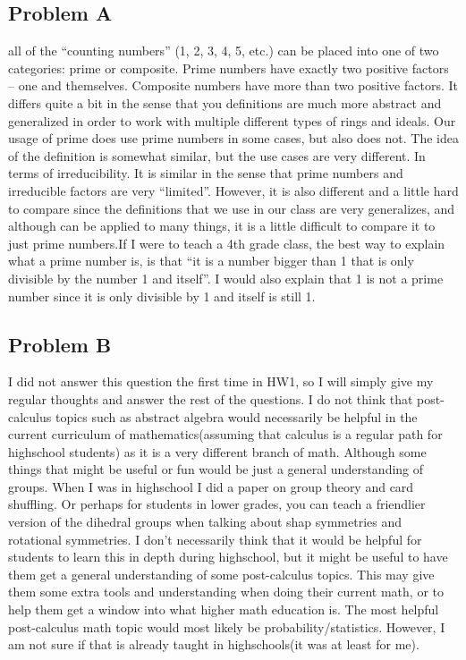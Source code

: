 \documentclass[12pt]{article}
\begin{document}
\subsection*{Problem A}
all of the “counting numbers” (1, 2, 3, 4, 5, etc.) can be placed into one of two categories: prime or composite. Prime numbers have exactly two positive factors – one and themselves. Composite numbers have more than two positive factors. It differs quite a bit in the sense that you definitions are much more abstract and generalized in order to work with multiple different types of rings and ideals. Our usage of prime does use prime numbers in some cases, but also does not. The idea of the definition is somewhat similar, but the use cases are very different. In terms of irreducibility. It is similar in the sense that prime numbers and irreducible factors are very “limited”. However, it is also different and a little hard to compare since the definitions that we use in our class are very generalizes, and although can be applied to many things, it is a little difficult to compare it to just prime numbers.If I were to teach a 4th grade class, the best way to explain what a prime number is, is that “it is a number bigger than 1 that is only divisible by the number 1 and itself”. I would also explain that 1 is not a prime number since it is only divisible by 1 and itself is still 1. 

\subsection*{Problem B}
I did not answer this question the first time in HW1, so I will simply give my regular thoughts and answer the rest of the questions. I do not think that post-calculus topics such as abstract algebra would necessarily be helpful in the current curriculum of mathematics(assuming that calculus is a regular path for highschool students) as it is a very different branch of math. Although some things that might be useful or fun would be just a general understanding of groups. When I was in highschool I did a paper on group theory and card shuffling. Or perhaps for students in lower grades, you can teach a friendlier version of the dihedral groups when talking about shap symmetries and rotational symmetries. I don't necessarily think that it would be helpful for students to learn this in depth during highschool, but it might be useful to have them get a general understanding of some post-calculus topics. This may give them some extra tools and understanding when doing their current math, or to help them get a window into what higher math education is. The most helpful post-calculus math topic would most likely be probability/statistics. However, I am not sure if that is already taught in highschools(it was at least for me).
\end{document}
